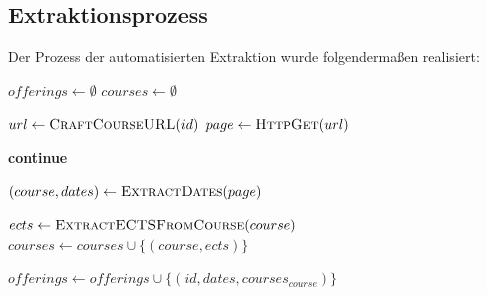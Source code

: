 \subsection{Extraktionsprozess}\label{0302_daten_extraktion}\label{chap:scraping}


Der Prozess der automatisierten Extraktion wurde folgendermaßen realisiert:


\begin{algorithm}[H]
  \caption{Datenextraktion aus Vorlesungsverzeichnis}
  \label{alg:datenextraktion}
  \begin{algorithmic}[1]
    \State $\mathit{offerings} \gets \emptyset$
    \State $\mathit{courses} \gets \emptyset$

    \State $url \gets \textsc{CraftCourseURL}(id)$
    \State $page \gets \textsc{HttpGet}(url)$

    \State \textbf{continue}
    \EndIf

    \State $(course, dates) \gets \textsc{ExtractDates}(page)$

    \State $ects \gets \textsc{ExtractECTSFromCourse}(course)$
    \State $courses \gets courses \cup \{(course, ects)\}$
    \EndIf

    \State $\mathit{offerings} \gets \mathit{offerings} \cup \{(id, dates, courses_{course})\}$
    \EndFor

  \end{algorithmic}
\end{algorithm}
